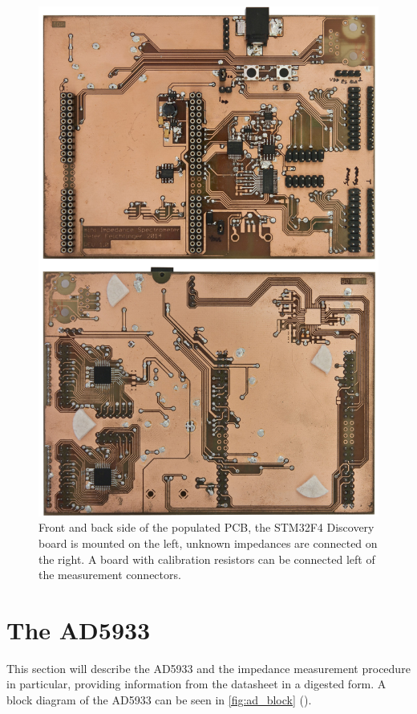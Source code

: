 \begin{figure}[htpb]
  \centering
    \includegraphics[width=\textwidth]{bilder/pcb_frontback.jpg}
  \caption{Front and back side of the populated PCB, the STM32F4 Discovery board is mounted on the left, unknown
    impedances are connected on the right. A board with calibration resistors can be connected left of the measurement
    connectors.}
  \label{fig:pcb_frontback}
\end{figure}


\section{The AD5933}

This section will describe the AD5933 and the impedance measurement procedure in particular, providing information
from the datasheet\footnotemark{} in a digested form.
A block diagram of the AD5933 can be seen in \autoref{fig:ad_block} ().

